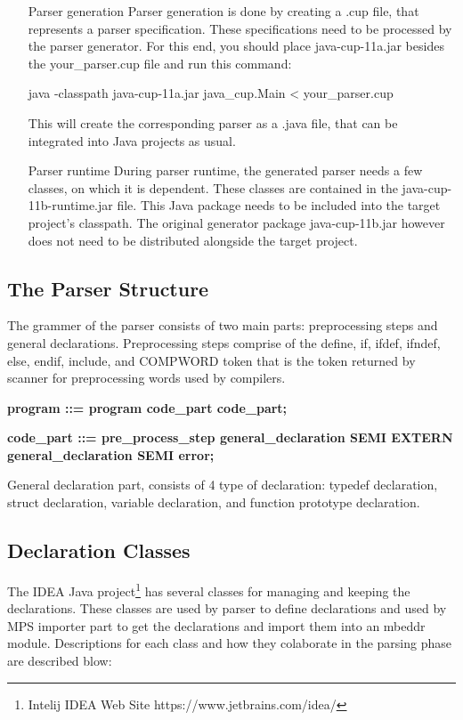 \documentclass[titlepage]{article}
\begin{document}
\begin{itemize}
\item[Parser generation]
Parser generation is done by creating a .cup file, that represents a parser specification. These specifications need to be processed by the parser generator. For this end, you should place java-cup-11a.jar besides the your\_parser.cup file and run this command: 

java -classpath java-cup-11a.jar java\_cup.Main < your\_parser.cup

This will create the corresponding parser as a .java file, that can be integrated into Java projects as usual.

\item[Parser runtime]
During parser runtime, the generated parser needs a few classes, on which it is dependent. These classes are contained in the java-cup-11b-runtime.jar file. This Java package needs to be included into the target project's classpath. The original generator package java-cup-11b.jar however does not need to be distributed alongside the target project.

\end{itemize}





\subsection{The Parser Structure}
The grammer of the parser consists of two main parts: preprocessing steps and general declarations. Preprocessing steps comprise of the define, if, ifdef, ifndef, else, endif, include, and COMPWORD token that is the token returned by scanner for preprocessing words used by compilers.

\textbf{program ::= program code\_part \textbar code\_part;}

\textbf{code\_part ::= pre\_process\_step \textbar general\_declaration SEMI \textbar EXTERN general\_declaration SEMI \textbar error;}

General declaration part, consists of 4 type of declaration: typedef declaration, struct declaration, variable declaration, and function prototype declaration.

\subsection{Declaration Classes}
The IDEA Java project\footnote{Intelij IDEA Web Site https://www.jetbrains.com/idea/} has several classes for managing and keeping the declarations. These classes are used by parser to define declarations and used by MPS importer part to get the declarations and import them into an mbeddr module. Descriptions for each class and how they colaborate in the parsing phase are described blow:
\end{document}
